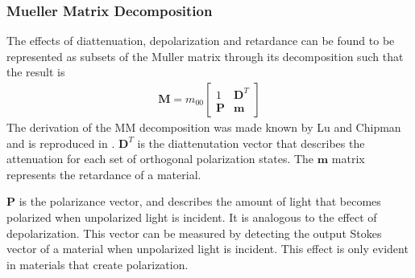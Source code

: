 \subsubsection{Mueller Matrix Decomposition}

The effects of diattenuation, depolarization and retardance can be found to be represented as subsets of the Muller matrix through its decomposition such that the result is
\begin{align}
    \mathbf{M} = m_{00}
    \begin{bmatrix}
        1 & \mathbf{D}^T \\
        \mathbf{P} & \mathbf{m}
    \end{bmatrix}
\end{align}
The derivation of the MM decomposition was made known by Lu and Chipman and is reproduced in \cite{polarizedlight}. $\mathbf{D}^T$ is the diattenutation vector that describes the attenuation for each set of orthogonal polarization states. The $\mathbf{m}$ matrix represents the retardance of a material.

$\mathbf{P}$ is the polarizance vector, and describes the amount of light that becomes polarized when unpolarized light is incident.  It is analogous to the effect of depolarization.  This vector can be measured by detecting the output Stokes vector of a material when unpolarized light is incident.  This effect is only evident in materials that create polarization.

